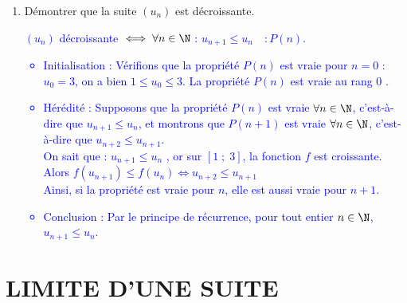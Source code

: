 \documentclass[11pt,twoside, openany]{extbook}
\begin{document}
\begin{application}{}
\begin{enumerate}
{\begin{itemize}
On sait que : $1 \leqslant u_n \leqslant 3$ ,  or sur $[1\;;\;3]$, la fonction $f$ est croissante. \\ Alors $ f(1) \leqslant f(u_n) \leqslant f(3) \iff 1 \leqslant u_{n+1} \leqslant 2 \leqslant 3 \iff 1 \leqslant u_{n+1} \leqslant 3$ \\
Ainsi, si la propriété est vraie pour $n$, elle est aussi vraie pour $n + 1$.
    \item Conclusion : Par le principe de récurrence, pour tout entier $n \in \N$, $1 \leqslant u_n \leqslant 3$.
\end{itemize}} \vspace{0.5cm}
	\item Démontrer que la suite $(u_n)$ est décroissante. \vspace{0.5cm}\\
     \textcolor{blue}{$(u_n)$ décroissante $\iff \forall n \in \N$ : $u_{n+1} \leqslant u_n \quad : P(n) $. 
\begin{itemize}
    \item Initialisation : Vérifions que la propriété $P(n)$ est vraie pour  $n = 0$ :\\
$u_0 = 3$, on a bien $1 \leqslant u_0 \leqslant 3$.
La propriété $P(n)$ est vraie au rang  $0$ .
    \item Hérédité : Supposons que la propriété $P(n)$ est vraie $\forall n \in \N$, c'est-à-dire que $u_{n+1} \leqslant u_n$, et montrons que $P(n+1)$ est vraie $\forall n \in \N$, c'est-à-dire que $u_{n+2} \leqslant u_{n+1}$.\\
On sait que : $u_{n+1} \leqslant u_n$ ,  or sur $[1\;;\;3]$, la fonction $f$ est croissante. \\ Alors $ f(u_{n+1}) \leqslant f(u_n)  \iff u_{n+2} \leqslant u_{n+1}$ \\
Ainsi, si la propriété est vraie pour $n$, elle est aussi vraie pour $n + 1$.
    \item Conclusion : Par le principe de récurrence, pour tout entier $n \in \N$, $u_{n+1} \leqslant u_n$.
\end{itemize}}
\end{enumerate}
\end{application}







\newpage
\section{LIMITE D'UNE SUITE}
\end{document}
